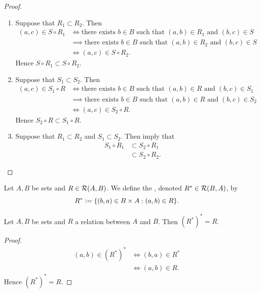 \begin{proof}\
	\begin{enumerate}
		\item Suppose that $R_1 \subset R_2$. Then 
		\begin{align*}
			(a, c) \in S \circ R_1
			& \iff \text{there exists $b \in B$ such that $(a,b) \in R_1$ and $(b,c) \in S$} \\
			& \implies \text{there exists $b \in B$ such that $(a,b) \in R_2$ and $(b,c) \in S$} \\
			& \iff (a, c) \in S \circ R_2.
		\end{align*}
		Hence $S \circ R_1 \subset S \circ R_2$.
		\item Suppose that $S_1 \subset S_2$. Then
		\begin{align*}
			(a, c) \in S_1 \circ R
			& \iff \text{there exists $b \in B$ such that $(a,b) \in R$ and $(b,c) \in S_1$} \\
			& \implies \text{there exists $b \in B$ such that $(a,b) \in R$ and $(b,c) \in S_2$} \\
			& \iff (a, c) \in S_2 \circ R.
		\end{align*}
		Hence $S_2 \circ R \subset S_1 \circ R$.
		\item Suppose that $R_1 \subset R_2$ and $S_1 \subset S_2$. Then  imply that
		\begin{align*}
			S_1 \circ R_1
			& \subset S_2 \circ R_1 \\
			& \subset S_2 \circ R_2.
		\end{align*}
	\end{enumerate}
\end{proof}

\begin{defn}
	Let $A, B$ be sets and $R \in \mathcal{R}(A,B)$. We define the , denoted $R^* \in \mathcal{R}(B,A)$, by 
	$$R^* \vcentcolon= \{(b,a) \in B \times A: (a,b) \in R\}.$$
\end{defn}

\begin{ex}
	Let $A, B$ be sets and $R$ a relation between $A$ and $B$. Then $(R^*)^* = R$.
\end{ex}

\begin{proof}
	\begin{align*}
		(a,b) \in (R^*)^*
		& \iff (b,a) \in R^* \\
		& \iff (a,b) \in R.
	\end{align*}
	Hence $(R^*)^* = R$.
\end{proof}

